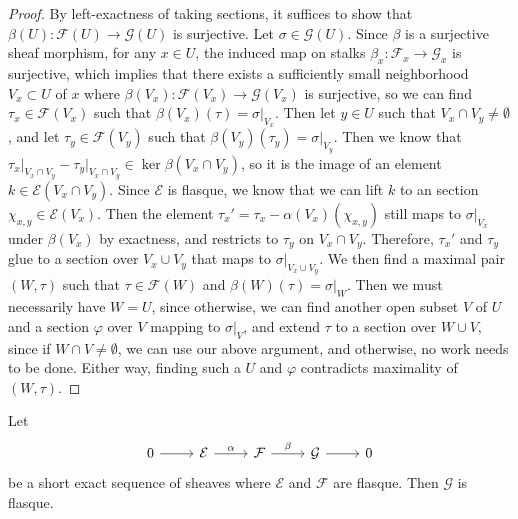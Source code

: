 %
\begin{proof}
By left-exactness of taking sections, it suffices to show that
$\beta(U) : \mathcal{F}(U) \to \mathcal{G}(U)$ is surjective. Let
$\sigma \in \mathcal{G}(U)$. Since $\beta$ is a surjective sheaf morphism, for any
$x \in U$, the induced map on stalks $\beta_x : \mathcal{F}_x \to \mathcal{G}_x$ is
surjective, which implies that there exists a sufficiently small neighborhood
$V_x \subset U$ of $x$ where
$\beta(V_x) : \mathcal{F}(V_x) \to \mathcal{G}(V_x)$ is surjective,
so we can find $\tau_x \in \mathcal{F}(V_x)$ such that
$\beta(V_x)(\tau) = \sigma\vert_{V_x}$. Then let $y \in U$ such that
$V_x \cap V_y \neq \emptyset$, and let $\tau_y \in \mathcal{F}(V_y)$ such that
$\beta(V_y)(\tau_y) = \sigma\vert_{V_y}$. Then we know that
$\tau_x\vert_{V_x \cap V_y} - \tau_y\vert_{V_x \cap V_y} \in \ker\beta(V_x \cap V_y)$,
so it is the image of an element $k \in \mathcal{E}(V_x \cap V_y)$. Since $\mathcal{E}$
is flasque, we know that we can lift $k$ to an section $\chi_{x,y} \in \mathcal{E}(V_x)$.
Then the element $\tau_x' = \tau_x - \alpha(V_x)(\chi_{x,y})$ still maps to
$\sigma\vert_{V_x}$  under $\beta(V_x)$ by exactness, and restricts to $\tau_y$ on
$V_x \cap V_y$. Therefore, $\tau_x'$ and $\tau_y$ glue to a section over $V_x \cup V_y$
that maps to $\sigma\vert_{V_x \cup V_y}$.  We then find a maximal pair $(W, \tau)$ such
that $\tau \in \mathcal{F}(W)$ and $\beta(W)(\tau) = \sigma\vert_W$. Then we must
necessarily have $W = U$, since otherwise, we can find another open subset $V$ of $U$
and a section $\varphi$ over $V$ mapping to $\sigma\vert_V$, and extend $\tau$ to a
section over $W \cup V$, since if $W \cap V \neq \emptyset$, we can use our above
argument, and otherwise, no work needs to be done. Either way, finding such a $U$
and $\varphi$ contradicts maximality of $(W,\tau)$.
\end{proof}
%
\begin{lem}
Let
\[\begin{tikzcd}
0 \ar[r] & \mathcal{E} \ar[r,"\alpha"] & \mathcal{F} \ar[r,"\beta"]
& \mathcal{G} \ar[r] & 0
\end{tikzcd}\]
be a short exact sequence of sheaves where $\mathcal{E}$ and $\mathcal{F}$ are flasque.
Then $\mathcal{G}$ is flasque.
\end{lem}
%
